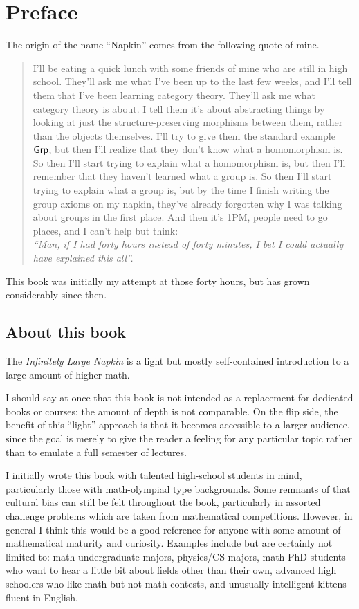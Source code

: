 \chapter{Preface}
The origin of the name ``Napkin''
comes from the following quote of mine.
\begin{quote}
\small
I'll be eating a quick lunch with some friends of mine
who are still in high school.
They'll ask me what I've been up to the last few weeks,
and I'll tell them that I've been learning category theory.
They'll ask me what category theory is about.
I tell them it's about abstracting things by looking at just the
structure-preserving morphisms between them, rather than the objects themselves.
I'll try to give them the standard example $\mathsf{Grp}$,
but then I'll realize that they don't know what a homomorphism is.
So then I'll start trying to explain what a homomorphism is,
but then I'll remember that they haven't learned what a group is.
So then I'll start trying to explain what a group is,
but by the time I finish writing the group axioms on my napkin,
they've already forgotten why I was talking about groups in the first place.
And then it's 1PM, people need to go places, and I can't help but think: \\[0.5ex]
\emph{``Man, if I had forty hours instead of forty minutes,
I bet I could actually have explained this all''.}
\end{quote}
This book was initially my attempt at those forty hours,
but has grown considerably since then.

\section*{About this book}
The \emph{Infinitely Large Napkin} is a light
but mostly self-contained introduction to a large
amount of higher math.

I should say at once that this book is not intended
as a replacement for dedicated books or courses;
the amount of depth is not comparable.
On the flip side, the benefit of this ``light'' approach
is that it becomes accessible to a larger audience,
since the goal is merely to give the reader a feeling for
any particular topic rather than to emulate a full semester of lectures.

I initially wrote this book with talented high-school students in mind,
particularly those with math-olympiad type backgrounds.
Some remnants of that cultural bias can still be felt throughout the book,
particularly in assorted challenge problems which are
taken from mathematical competitions.
However, in general I think this would be a good reference
for anyone with some amount of mathematical maturity and curiosity.
Examples include but are certainly not limited to:
math undergraduate majors, physics/CS majors,
math PhD students who want to hear a little bit
about fields other than their own,
advanced high schoolers who like math but not math contests,
and unusually intelligent kittens fluent in English.

